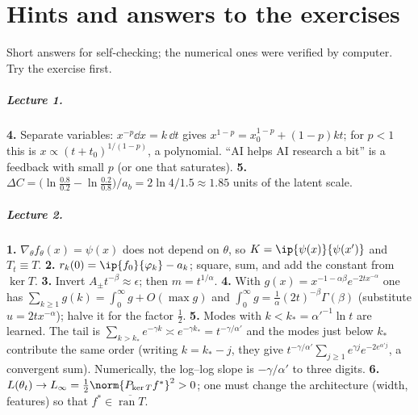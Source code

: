\chapter*{Hints and answers to the exercises}
\begin{beyond}
Short answers for self-checking; the numerical ones were verified by computer. Try the exercise first.
\end{beyond}
\small
\paragraph{Lecture 1.}
\textbf{4.} Separate variables: $x^{-p}\dd x=k\,\dd t$ gives $x^{1-p}=x_0^{1-p}+(1-p)kt$; for $p<1$ this is $x\propto(t+t_0)^{1/(1-p)}$, a polynomial. ``AI helps AI research a bit'' is a feedback with small $p$ (or one that saturates).
\textbf{5.} $\Delta C=\big(\ln\tfrac{0.8}{0.2}-\ln\tfrac{0.2}{0.8}\big)/a_b=2\ln4/1.5\approx1.85$ units of the latent scale.

\paragraph{Lecture 2.}
\textbf{1.} $\nabla_\theta f_\theta(x)=\psi(x)$ does not depend on $\theta$, so $K=\ip{\psi(x)}{\psi(x')}$ and $T_t\equiv T$. \quad
\textbf{2.} $r_k(0)=\ip{f_0}{\varphi_k}-a_k$; square, sum, and add the constant from $\ker T$. \quad
\textbf{3.} Invert $A_\pm t^{-\beta}\approx\epsilon$; then $m=t^{1/\alpha}$. \quad
\textbf{4.} With $g(x)=x^{-1-\alpha\beta}e^{-2tx^{-\alpha}}$ one has $\sum_{k\ge1}g(k)=\int_0^\infty g+O(\max g)$ and $\int_0^\infty g=\frac1\alpha(2t)^{-\beta}\Gamma(\beta)$ (substitute $u=2tx^{-\alpha}$); halve it for the factor $\tfrac12$. \quad
\textbf{5.} Modes with $k<k_*=\alpha'^{-1}\ln t$ are learned. The tail is $\sum_{k>k_*}e^{-\gamma k}\asymp e^{-\gamma k_*}=t^{-\gamma/\alpha'}$ and the modes just below $k_*$ contribute the same order (writing $k=k_*-j$, they give $t^{-\gamma/\alpha'}\sum_{j\ge1}e^{\gamma j}e^{-2e^{\alpha'j}}$, a convergent sum). Numerically, the log--log slope is $-\gamma/\alpha'$ to three digits. \quad
\textbf{6.} $L(\theta_t)\to L_\infty=\tfrac12\norm{P_{\ker T}f^*}^2>0$; one must change the architecture (width, features) so that $f^*\in\overline{\operatorname{ran}T}$.

